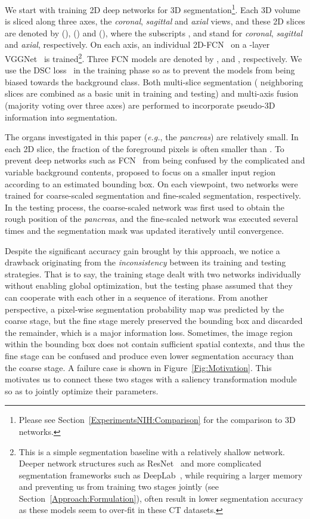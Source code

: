\documentclass[10pt,twocolumn,letterpaper]{article}
\begin{document}
We start with training 2D deep networks for 3D segmentation\footnote{
Please see Section~\ref{ExperimentsNIH:Comparison} for the comparison to 3D networks.}.
Each 3D volume  is sliced along three axes, the {\em coronal}, {\em sagittal} and {\em axial} views,
and these 2D slices are denoted by  (),
 () and  (),
where the subscripts ,  and 
stand for {\em coronal}, {\em sagittal} and {\em axial}, respectively.
On each axis, an individual 2D-FCN~\cite{Long_2015_Fully} on a -layer VGGNet~\cite{Simonyan_2015_Very} is trained\footnote{
This is a simple segmentation baseline with a relatively shallow network.
Deeper network structures such as ResNet~\cite{He_2016_Deep}
and more complicated segmentation frameworks such as DeepLab~\cite{Chen_2015_Semantic},
while requiring a larger memory and preventing us from training two stages jointly (see Section~\ref{Approach:Formulation}),
often result in lower segmentation accuracy as these models seem to over-fit in these CT datasets.}.
Three FCN models are denoted by ,  and , respectively.
We use the DSC loss~\cite{Milletari_2016_VNet} in the training phase
so as to prevent the models from being biased towards the background class.
Both multi-slice segmentation ( neighboring slices are combined as a basic unit in training and testing)
and multi-axis fusion (majority voting over three axes) are performed to incorporate pseudo-3D information into segmentation.

The organs investigated in this paper ({\em e.g.}, the {\em pancreas}) are relatively small.
In each 2D slice, the fraction of the foreground pixels is often smaller than .
To prevent deep networks such as FCN~\cite{Long_2015_Fully} from being confused by the complicated and variable background contents,
\cite{Zhou_2017_Fixed} proposed to focus on a smaller input region according to an estimated bounding box.
On each viewpoint, two networks were trained for coarse-scaled segmentation and fine-scaled segmentation, respectively.
In the testing process, the coarse-scaled network was first used to obtain the rough position of the {\em pancreas},
and the fine-scaled network was executed several times and the segmentation mask was updated iteratively until convergence.

Despite the significant accuracy gain brought by this approach,
we notice a drawback originating from the {\em inconsistency} between its training and testing strategies.
That is to say, the training stage dealt with two networks individually without enabling global optimization,
but the testing phase assumed that they can cooperate with each other in a sequence of iterations.
From another perspective, a pixel-wise segmentation probability map was predicted by the coarse stage,
but the fine stage merely preserved the bounding box and discarded the remainder, which is a major information loss.
Sometimes, the image region within the bounding box does not contain sufficient spatial contexts,
and thus the fine stage can be confused and produce even lower segmentation accuracy than the coarse stage.
A failure case is shown in Figure~\ref{Fig:Motivation}.
This motivates us to connect these two stages with a saliency transformation module so as to jointly optimize their parameters.
\end{document}
